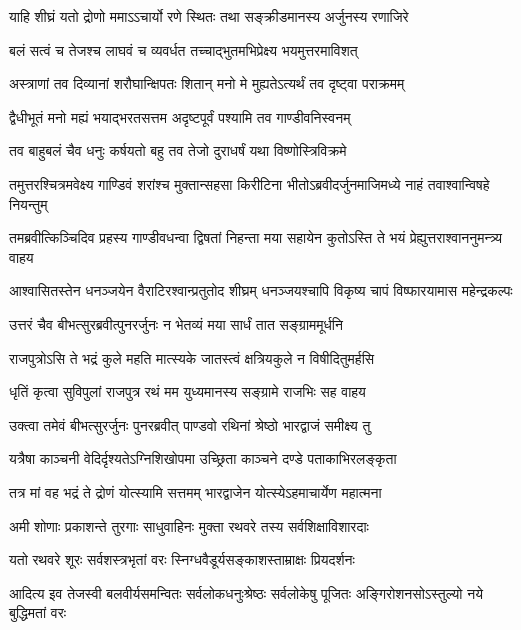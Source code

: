 \twolineshloka
{याहि शीघ्रं यतो द्रोणो ममाऽऽचार्यो रणे स्थितः}
{तथा सङ्क्रीडमानस्य अर्जुनस्य रणाजिरे}


\twolineshloka
{बलं सत्वं च तेजश्च लाघवं च व्यवर्धत}
{तच्चाद्भुतमभिप्रेक्ष्य भयमुत्तरमाविशत्}


\twolineshloka
{अस्त्राणां तव दिव्यानां शरौघान्क्षिपतः शितान्}
{मनो मे मुह्यतेऽत्यर्थं तव दृष्ट्वा पराक्रमम्}


\twolineshloka
{द्वैधीभूतं मनो मह्यं भयाद्भरतसत्तम}
{अदृष्टपूर्वं पश्यामि तव गाण्डीवनिस्वनम्}


\twolineshloka
{तव बाहुबलं चैव धनुः कर्षयतो बहु}
{तव तेजो दुराधर्षं यथा विष्णोस्त्रिविक्रमे}



\twolineshloka
{तमुत्तरश्चित्रमवेक्ष्य गाण्डिवं शरांश्च मुक्तान्सहसा किरीटिना}
{भीतोऽब्रवीदर्जुनमाजिमध्ये नाहं तवाश्वान्विषहे नियन्तुम्}


\twolineshloka
{तमब्रवीत्किञ्चिदिव प्रहस्य गाण्डीवधन्वा द्विषतां निहन्ता}
{मया सहायेन कुतोऽस्ति ते भयं प्रेह्युत्तराश्वाननुमन्त्र्य वाहय}



\twolineshloka
{आश्वासितस्तेन धनञ्जयेन वैराटिरश्वान्प्रतुतोद शीघ्रम्}
{धनञ्जयश्चापि विकृष्य चापं विष्फारयामास महेन्द्रकल्पः}


\twolineshloka
{उत्तरं चैव बीभत्सुरब्रवीत्पुनरर्जुनः}
{न भेतव्यं मया सार्धं तात सङ्ग्राममूर्धनि}


\twolineshloka
{राजपुत्रोऽसि ते भद्रं कुले महति मात्स्यके}
{जातस्त्वं क्षत्रियकुले न विषीदितुमर्हसि}


\twolineshloka
{धृतिं कृत्वा सुविपुलां राजपुत्र रथं मम}
{युध्यमानस्य सङ्ग्रामे राजभिः सह वाहय}


\twolineshloka
{उक्त्वा तमेवं बीभत्सुरर्जुनः पुनरब्रवीत्}
{पाण्डवो रथिनां श्रेष्ठो भारद्वाजं समीक्ष्य तु}


\twolineshloka
{यत्रैषा काञ्चनी वेदिर्दृश्यतेऽग्निशिखोपमा}
{उच्छ्रिता काञ्चने दण्डे पताकाभिरलङ्कृता}


\twolineshloka
{तत्र मां वह भद्रं ते द्रोणं योत्स्यामि सत्तमम्}
{भारद्वाजेन योत्स्येऽहमाचार्येण महात्मना}


\twolineshloka
{अमी शोणाः प्रकाशन्ते तुरगाः साधुवाहिनः}
{मुक्ता रथवरे तस्य सर्वशिक्षाविशारदाः}


\twolineshloka
{यतो रथवरे शूरः सर्वशस्त्रभृतां वरः}
{स्निग्धवैडूर्यसङ्काशस्ताम्राक्षः प्रियदर्शनः}


\threelineshloka
{आदित्य इव तेजस्वी बलवीर्यसमन्वितः}
{सर्वलोकधनुःश्रेष्ठः सर्वलोकेषु पूजितः}
{अङ्गिरोशनसोऽस्तुल्यो नये बुद्धिमतां वरः}


